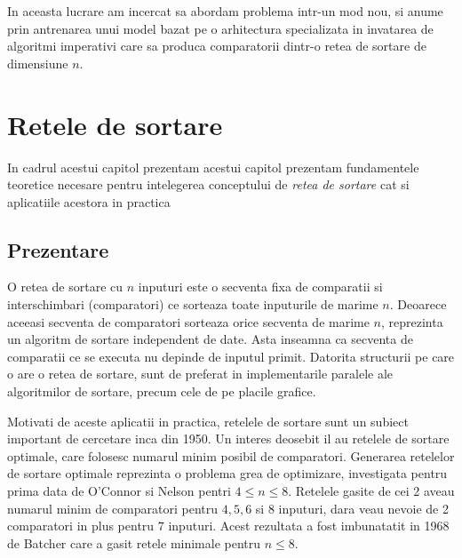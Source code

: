 \documentclass[12pt]{article}
\begin{document}
In aceasta lucrare am incercat sa abordam problema intr-un mod nou, si anume prin antrenarea unui model bazat pe o arhitectura specializata in invatarea de algoritmi imperativi care sa produca comparatorii dintr-o retea de sortare de dimensiune $n$.

\section{Retele de sortare}

In cadrul acestui capitol prezentam acestui capitol prezentam fundamentele teoretice necesare pentru intelegerea conceptului de \textit{retea de sortare} cat si aplicatiile acestora in practica

\subsection{Prezentare}

O retea de sortare cu $n$ inputuri este o secventa fixa de comparatii si interschimbari (comparatori) ce sorteaza toate inputurile de marime $n$. Deoarece aceeasi secventa de comparatori sorteaza orice secventa de marime $n$, reprezinta un algoritm de sortare independent de date. Asta inseamna ca secventa de comparatii ce se executa nu depinde de inputul primit. Datorita structurii pe care o are o retea de sortare, sunt de preferat in implementarile paralele ale algoritmilor de sortare, precum cele de pe placile grafice.

Motivati de aceste aplicatii in practica, retelele de sortare sunt un subiect important de cercetare inca din 1950. Un interes deosebit il au retelele de sortare optimale, care folosesc numarul minim posibil de comparatori. Generarea retelelor de sortare optimale reprezinta o problema grea de optimizare, investigata pentru prima data de O'Connor si Nelson pentri $4 \leq n \leq 8$. Retelele gasite de cei 2 aveau numarul minim de comparatori pentru $4, 5, 6$ si $8$ inputuri, dara veau nevoie de 2 comparatori in plus pentru $7$ inputuri. Acest rezultata a fost imbunatatit in 1968 de Batcher care a gasit retele minimale pentru $n \leq 8$.
\end{document}
